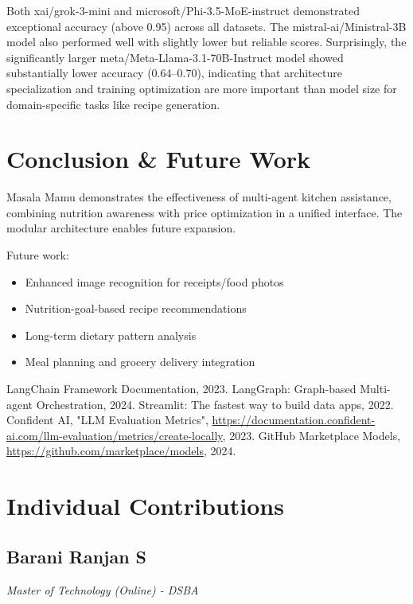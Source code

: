 \documentclass{ecai}
\begin{document}
Both xai/grok-3-mini and microsoft/Phi-3.5-MoE-instruct demonstrated exceptional accuracy (above 0.95) across all datasets. The mistral-ai/Ministral-3B model also performed well with slightly lower but reliable scores. Surprisingly, the significantly larger meta/Meta-Llama-3.1-70B-Instruct model showed substantially lower accuracy (0.64–0.70), indicating that architecture specialization and training optimization are more important than model size for domain-specific tasks like recipe generation.

\section{Conclusion \& Future Work}

Masala Mamu demonstrates the effectiveness of multi-agent kitchen assistance, combining nutrition awareness with price optimization in a unified interface. The modular architecture enables future expansion.

Future work:
\begin{itemize}[noitemsep,topsep=0pt]
    \item Enhanced image recognition for receipts/food photos
    \item Nutrition-goal-based recipe recommendations
    \item Long-term dietary pattern analysis
    \item Meal planning and grocery delivery integration
\end{itemize}


\begin{thebibliography}{9}
 LangChain Framework Documentation, 2023.
 LangGraph: Graph-based Multi-agent Orchestration, 2024.
 Streamlit: The fastest way to build data apps, 2022.
 Confident AI, "LLM Evaluation Metrics", \url{https://documentation.confident-ai.com/llm-evaluation/metrics/create-locally}, 2023.
 GitHub Marketplace Models, \url{https://github.com/marketplace/models}, 2024.
\end{thebibliography}

\clearpage
\section*{Individual Contributions}

\subsection*{Barani Ranjan S}
\textit{Master of Technology (Online) - DSBA}
\end{document}
